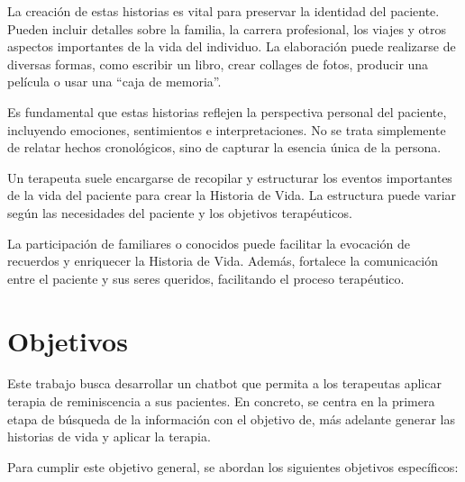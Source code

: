 La creación de estas historias es vital para preservar la identidad del paciente. Pueden incluir detalles sobre la familia, la carrera profesional, los viajes y otros aspectos importantes de la vida del individuo. La elaboración puede realizarse de diversas formas, como escribir un libro, crear collages de fotos, producir una película o usar una ``caja de memoria''.

Es fundamental que estas historias reflejen la perspectiva personal del paciente, incluyendo emociones, sentimientos e interpretaciones. No se trata simplemente de relatar hechos cronológicos, sino de capturar la esencia única de la persona.

Un terapeuta suele encargarse de recopilar y estructurar los eventos importantes de la vida del paciente para crear la Historia de Vida. La estructura puede variar según las necesidades del paciente y los objetivos terapéuticos.

La participación de familiares o conocidos puede facilitar la evocación de recuerdos y enriquecer la Historia de Vida. Además, fortalece la comunicación entre el paciente y sus seres queridos, facilitando el proceso terapéutico.

\section{Objetivos}
\label{sec:objetivos}
Este trabajo  busca desarrollar un chatbot que permita a los terapeutas aplicar terapia de reminiscencia a sus pacientes. En concreto, se centra en la primera etapa de búsqueda de la información con el objetivo de, más adelante generar las historias de vida y aplicar la terapia. 

Para cumplir este objetivo general, se abordan los siguientes objetivos específicos:

